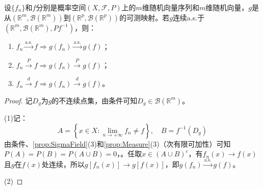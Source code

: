 \begin{theorem}\label{theo:ContinuousMappingTheorem}
	设$\{f_n\}$和$f$分别是概率空间$(X,\mathscr{F},P)$上的$m$维随机向量序列和$m$维随机向量，$g$是从$(\mathbb{R}^{m},\mathcal{B}(\mathbb{R}^{m}))$到$(\mathbb{R}^{p},\mathcal{B}(\mathbb{R}^{p}))$的可测映射。若$g$连续a.s.于$(\mathbb{R}^{m},\mathcal{B}(\mathbb{R}^{m}),Pf^{-1})$，则：
	\begin{enumerate}
		\item $f_n\overset{\text{a.s.}}{\longrightarrow}f\Rightarrow g(f_n)\overset{\text{a.s.}}{\longrightarrow}g(f)$；
		\item $f_n\overset{P}{\longrightarrow}f\Rightarrow g(f_n)\overset{P}{\longrightarrow}g(f)$；
		\item $f_n\overset{d}{\longrightarrow}f\Rightarrow g(f_n)\overset{d}{\longrightarrow}g(f)$。
	\end{enumerate}
\end{theorem}
\begin{proof}
	记$D_g$为$g$的不连续点集，由条件可知$D_g\in\mathcal{B}(\mathbb{R}^{m})$。\par
	(1)记：
	\begin{equation*}
		A=\left\{x\in X:\lim_{n\to+\infty}f_n\ne f\right\},\quad B=f^{-1}(D_g)
	\end{equation*}
	由条件、\cref{prop:SigmaField}(3)和\cref{prop:Measure}(3)（次有限可加性）可知$P(A)=P(B)=P(A\cup B)=0$，。任取$x\in(A\cup B)^c$，有$f_n(x)\to f(x)$且$g$在$f(x)$处连续，所以$g[f_n(x)]\to g[f(x)]$，即$g(f_n)\overset{\text{a.s.}}{\longrightarrow}g(f)$。\par
	(2)
\end{proof}


